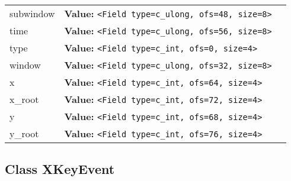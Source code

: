 \begin{longtable}{|p{\varnamewidth}|p{\vardescrwidth}|l}
\cline{1-2}
\raggedright s\-u\-b\-w\-i\-n\-d\-o\-w\- & \raggedright \textbf{Value:} 
{\tt {\textless}Field type=c\_ulong, ofs=48, size=8{\textgreater}}&\\
\cline{1-2}
\raggedright t\-i\-m\-e\- & \raggedright \textbf{Value:} 
{\tt {\textless}Field type=c\_ulong, ofs=56, size=8{\textgreater}}&\\
\cline{1-2}
\raggedright t\-y\-p\-e\- & \raggedright \textbf{Value:} 
{\tt {\textless}Field type=c\_int, ofs=0, size=4{\textgreater}}&\\
\cline{1-2}
\raggedright w\-i\-n\-d\-o\-w\- & \raggedright \textbf{Value:} 
{\tt {\textless}Field type=c\_ulong, ofs=32, size=8{\textgreater}}&\\
\cline{1-2}
\raggedright x\- & \raggedright \textbf{Value:} 
{\tt {\textless}Field type=c\_int, ofs=64, size=4{\textgreater}}&\\
\cline{1-2}
\raggedright x\-\_\-r\-o\-o\-t\- & \raggedright \textbf{Value:} 
{\tt {\textless}Field type=c\_int, ofs=72, size=4{\textgreater}}&\\
\cline{1-2}
\raggedright y\- & \raggedright \textbf{Value:} 
{\tt {\textless}Field type=c\_int, ofs=68, size=4{\textgreater}}&\\
\cline{1-2}
\raggedright y\-\_\-r\-o\-o\-t\- & \raggedright \textbf{Value:} 
{\tt {\textless}Field type=c\_int, ofs=76, size=4{\textgreater}}&\\
\cline{1-2}
\end{longtable}



\subsection{Class XKeyEvent}

